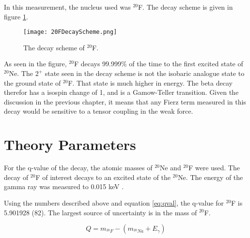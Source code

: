 In this measurement, the nucleus used was $^{20}$F.
The decay scheme is given in figure \ref{fig:DecayScheme}.

\begin{figure}[!htb]
	\centerline{\texttt{[image: 20FDecayScheme.png]}}
	\caption{The decay scheme of $^{20}$F.}
	\label{fig:DecayScheme}
\end{figure}

As seen in the figure, $^{20}$F decays 99.999\% of the time to the first excited state of $^{20}$Ne.
The $2^{+}$ state seen in the decay scheme is not the isobaric analogue state to the ground state of $^{20}$F.
That state is much higher in energy.
The beta decay therefor has a isospin change of 1, and is a Gamow-Teller transition.
Given the discussion in the previous chapter, it means that any Fierz term measured in this decay would be sensitive to a tensor coupling in the weak force.

\section{Theory Parameters}

For the q-value of the decay, the atomic masses of $^{20}$Ne and $^{20}$F were used.
The decay of $^{20}$F of interest decays to an excited state of the $^{20}$Ne.
The energy of the gamma ray was measured to 0.015 keV \cite{Til98}.

Using the numbers described above and equation \ref{eq:qval}, the q-value for $^{20}$F is 5.901928 (82).
The largest source of uncertainty is in the mass of $^{20}$F.

\begin{equation}
	Q = m_{^{20}F} - (m_{^{20}Na} + E_{\gamma})
	\label{eq:qval}
\end{equation}

